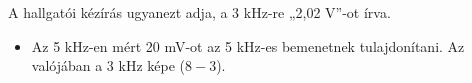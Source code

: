 \begin{center}\end{center}
\begin{tipp}
A hallgatói kézírás ugyanezt adja, a 3 kHz-re „2,02 V”-ot írva.
\end{tipp}
\begin{eredmeny}

\begin{center}\end{center}
\end{eredmeny}
\begin{figyelem}
\begin{itemize}
\item Az 5 kHz-en mért 20 mV-ot az 5 kHz-es bemenetnek tulajdonítani. Az valójában a 3 kHz képe ($8-3$).
\end{itemize}
\end{figyelem}


